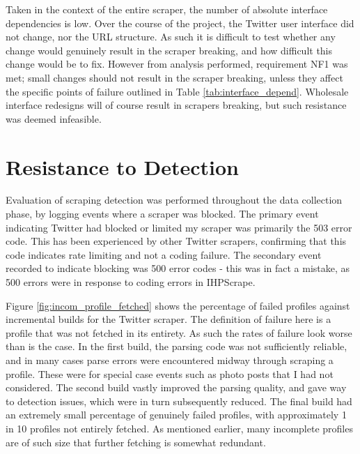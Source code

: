 Taken in the context of the entire scraper, the number of absolute interface dependencies is low. Over the course of the project, the Twitter user interface did not change, nor the URL structure. As such it is difficult to test whether any change would genuinely result in the scraper breaking, and how difficult this change would be to fix. However from analysis performed, requirement NF1 was met; small changes should not result in the scraper breaking, unless they affect the specific points of failure outlined in Table \ref{tab:interface_depend}. Wholesale interface redesigns will of course result in scrapers breaking, but such resistance was deemed infeasible. %

\section{Resistance to Detection}

Evaluation of scraping detection was performed throughout the data collection phase, by logging events where a scraper was blocked. The primary event indicating Twitter had blocked or limited my scraper was primarily the 503 error code. This has been experienced by other Twitter scrapers, confirming that this code indicates rate limiting and not a coding failure. The secondary event recorded to indicate blocking was 500 error codes - this was in fact a mistake, as 500 errors were in response to coding errors in IHPScrape.

Figure \ref{fig:incom_profile_fetched} shows the percentage of failed profiles against incremental builds for the Twitter scraper. The definition of failure here is a profile that was not fetched in its entirety. As such the rates of failure look worse than is the case. In the first build, the parsing code was not sufficiently reliable, and in many cases parse errors were encountered midway through scraping a profile. These were for special case events such as photo posts that I had not considered. The second build vastly improved the parsing quality, and gave way to detection issues, which were in turn subsequently reduced. The final build had an extremely small percentage of genuinely failed profiles, with approximately 1 in 10 profiles not entirely fetched. As mentioned earlier, many incomplete profiles are of such size that further fetching is somewhat redundant. 

